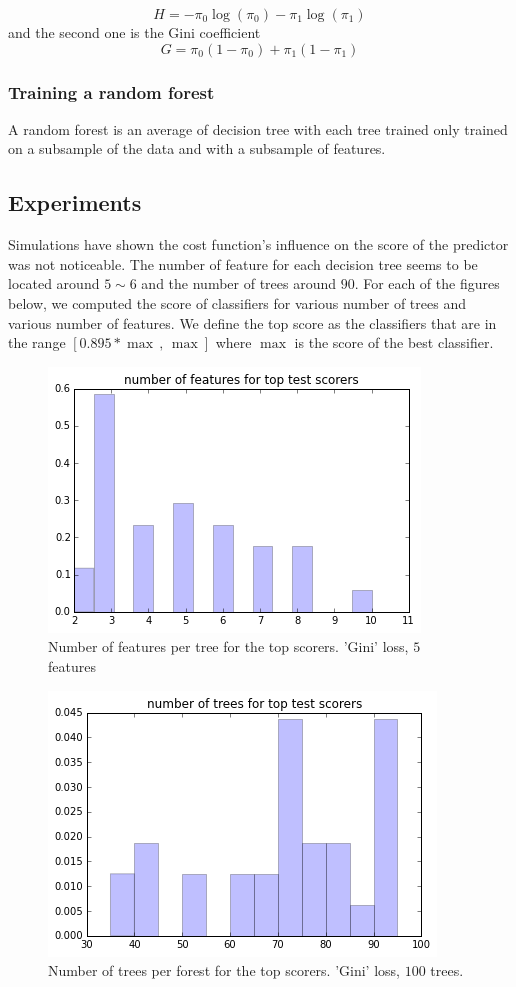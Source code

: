 \documentclass[a4paper]{article}
\theoremstyle{plain}
\begin{document}
$$H = - \pi_0 \log(\pi_0) - \pi_1 \log(\pi_1) $$
and the second one is the Gini coefficient 
$$ G  = \pi_0(1-\pi_0) + \pi_1(1-\pi_1) $$

\subsubsection*{Training a random forest}

A random forest is an average of decision tree with each tree trained only trained on a subsample of the data and with a subsample of features.

\subsection*{Experiments}

Simulations have shown the cost function's influence on the score of the predictor was not noticeable. The number of feature for each decision tree seems to be located around $5 \sim 6$ and the number of trees around $90$. For each of the figures below, we computed the score of classifiers for various number of trees and various number of features. We define the top score as the classifiers that are in the range $[0.895 * \max \, , \, \max]$ where $\max$ is the score of the best classifier.

\begin{figure}[H]
\centering
\includegraphics[scale=0.8]{number_features78.png}
\caption{Number of features per tree for the top scorers. 'Gini' loss, $5$ features}
\end{figure}

\begin{figure}[H]
\centering
\includegraphics[scale=0.8]{number_forest78.png}
\caption{Number of trees per forest for the top scorers. 'Gini' loss, $100$ trees.}
\end{figure}
\end{document}
